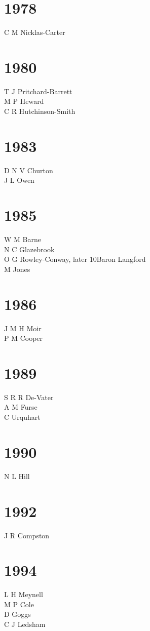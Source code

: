 \begin{multicols}{2}
  \section*{1978}
  C M Nicklas-Carter \\
  \section*{1980}
  T J Pritchard-Barrett \\
  M P Heward \\
  C R Hutchinson-Smith \\
  \section*{1983}
  D N V Churton \\
  J L Owen \\
  \section*{1985}
  W M Barne \\
  N C Glazebrook \\
  O G Rowley-Conway, later 10\nth Baron Langford \\
  M Jones \\
  \section*{1986}
  J M H Moir \\
  P M Cooper \\
  \section*{1989}
  S R R De-Vater \\
  A M Furse \\
  C Urquhart \\
  \section*{1990}
  N L Hill \\
  \section*{1992}
  J R Compston \\
  \section*{1994}
  L H Meynell \\
  M P Cole \\
  D Goggs \\
  C J Ledsham \\

\end{multicols}
